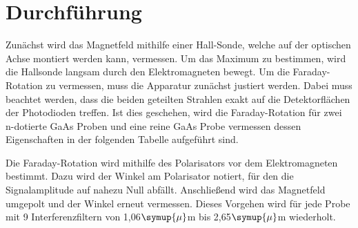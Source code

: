 \section{Durchführung}
Zunächst wird das Magnetfeld mithilfe einer Hall-Sonde, welche auf der optischen Achse montiert werden kann, vermessen.
Um das Maximum zu bestimmen, wird die Hallsonde langsam durch den Elektromagneten bewegt.
Um die Faraday-Rotation zu vermessen, muss die Apparatur zunächst justiert werden. Dabei muss beachtet werden, dass
die beiden geteilten Strahlen exakt auf die Detektorflächen der Photodioden treffen.
Ist dies geschehen, wird die Faraday-Rotation für zwei n-dotierte GaAs Proben und eine reine GaAs Probe vermessen dessen
Eigenschaften in der folgenden Tabelle aufgeführt sind.



Die Faraday-Rotation wird mithilfe des Polarisators vor dem Elektromagneten bestimmt. Dazu wird der Winkel am Polarisator notiert,
für den die Signalamplitude auf nahezu Null abfällt. Anschließend wird das Magnetfeld umgepolt und der Winkel erneut vermessen.
Dieses Vorgehen wird für jede Probe mit 9 Interferenzfiltern von 1,06\;$\symup{\mu}$m bis 2,65\;$\symup{\mu}$m  wiederholt.
